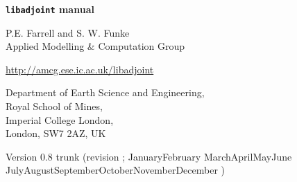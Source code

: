 \documentclass[11pt,a4paper]{book}
\newcommand{\libadjoint}[0]{{\texttt{libadjoint}}\xspace}
\def\today{\number\day\space\ifcase\month\or
 January\or February \or March\or April\or May\or June\or
 July\or August\or September\or October\or November\or December\fi
 \space\number\year}
\begin{document}

\dominitoc

\frontmatter

\begin{titlepage}

\begin{center}

\mbox{}

\vfill

{\bfseries{\huge
\libadjoint manual
\\}}

\vspace{40mm}

{\LARGE
P.E. Farrell and S. W. Funke\\
Applied Modelling \& Computation Group
\\}

\vspace{1mm}


{\LARGE
\url{http://amcg.ese.ic.ac.uk/libadjoint}
}

\vspace{10mm}

{\LARGE
Department of Earth Science and Engineering,\\
Royal School of Mines,\\
Imperial College London,\\
London, SW7 2AZ, UK
\\}

\vspace{80mm}


{\Large
Version 0.8 trunk (revision ; \today)
\\}

\vfill

\end{center}

\end{titlepage}



\renewcommand\l@section{\@dottedtocline{1}{1.5em}{2.7em}}
\renewcommand\l@subsection{\@dottedtocline{2}{4.2em}{3.6em}}
\renewcommand\l@subsubsection{\@dottedtocline{3}{7.8em}{4.5em}}

\makeatother

{ \setlength{\parskip}{0pt} \tableofcontents}

\newpage \clearpage \thispagestyle{plain}
\end{document}
